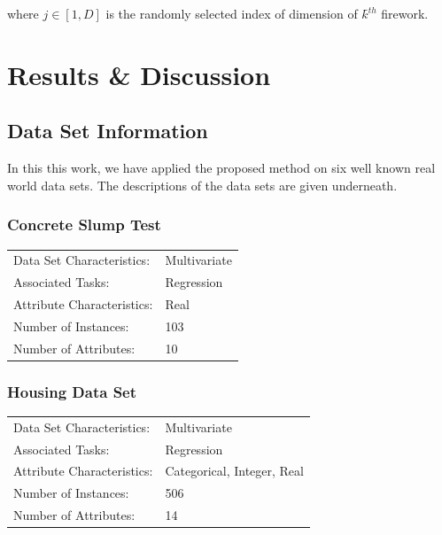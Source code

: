 \documentclass[11pt, a4paper]{report}
\begin{document}
where $ j \in [1,D] $ is the randomly selected index of dimension of ݇$ k^{th} $ firework.

%
%
%
%


\chapter{Results \& Discussion}

\section{Data Set Information}
In this this work, we have applied the proposed method on six well known real world data sets. The descriptions of the data sets are given underneath.
\subsection{Concrete Slump Test}
\begin{tabular}{l l}
	Data Set Characteristics:  & Multivariate \\
	Associated Tasks: & Regression  \\
	Attribute Characteristics: & Real \\
	Number of Instances: & 103 \\
	Number of Attributes: & 10 \\
\end{tabular}

\subsection{Housing Data Set}
\begin{tabular}{l l}
	Data Set Characteristics:  & Multivariate \\
	Associated Tasks: & Regression  \\
	Attribute Characteristics: & Categorical, Integer, Real \\
	Number of Instances: & 506 \\
	Number of Attributes: & 14 \\
\end{tabular}
\end{document}
